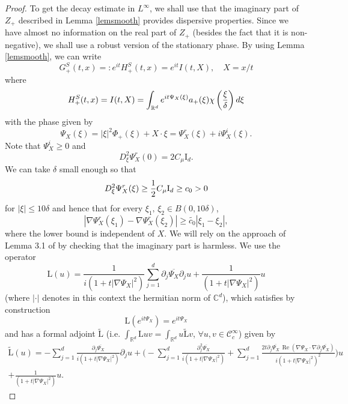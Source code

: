 \documentclass[11pt]{amsart}
\numberwithin{equation}{section}
\begin{document}
\begin{proof}
   To get the decay estimate in $L^\infty$, we shall use that the imaginary part  of $Z_{+}$ described in Lemma  \ref{lemsmooth}
     provides dispersive properties. 
    Since we have almost no information on the real part of $Z_{+}$ (besides the fact that it is non-negative), we shall use a robust version of the stationary
    phase.   By using Lemma   \ref{lemsmooth}, we can write
    $$   G^S_{+}(t,x)=: e^{it} H^S_{+}(t,x)= e^{it} I(t, X), \quad X= x/t$$
    where
    \begin{equation}
    \label{defHS+} H^S_{+}(t,x)=  I(t,X) = \int_{\mathbb{R}^d}  e^{ i t  \Psi_{X}(\xi) }  a_{+}(\xi) \chi\left({\xi \over \delta} \right)
    d \xi
    \end{equation}
    with the phase given by 
    $$ \Psi_{X}(\xi) = |\xi|^2 \Phi_{+}(\xi) +   X \cdot \xi= \Psi_{X}^r(\xi) + i \Psi_{X}^i(\xi).$$
    Note  that  $ \Psi_{X}^i  \ge 0$ and 
    $$ D_{\xi}^2\Psi^r_{X} (0)=   2  {C_{\mu}} \mbox{I}_{d}.$$
  We can take  $\delta $ small enough so that
  \begin{equation}
  \label{phasebelow0}   D_{\xi}^2\Psi^r_{X} (\xi) \geq    {1 \over 2}  {C_{\mu}} \mbox{I}_{d} \geq c_{0}>0
  \end{equation}
  for $| \xi| \leq  10 \delta$
  and hence  that for every $\xi_{1}, \, \xi_{2}  \in B(0, 10\delta)$, 
    \begin{equation}
    \label{phasebelow} | \nabla  \Psi^r_{X}(\xi_{1}) - \nabla  \Psi^r_{X}(\xi_{2}) | \geq  \tilde{ c_{0}}| \xi_{1} - \xi_{2}|,  
    \end{equation}
    where the lower bound is independent of $X$.
    We will rely on the approach of Lemma 3.1 of \cite{Farah-Rousset-Tzvetkov} by checking that the imaginary part
     is harmless.
 We use the operator
$$
\mathrm{L}(u)=\frac{1}{i(1+t|\nabla \Psi_{X}|^2)}\sum_{j=1}^{d} \partial_{j}\overline{\Psi_{X}}\partial_{j}u
+
\frac{1}{(1+t |\nabla \Psi_{X}|^2)}u 
$$
(where $| \cdot |$ denotes in this context the hermitian norm of $\mathbb{C}^d$),
which satisfies by construction 
\begin{equation}\label{id-L}
\mathrm{L}(e^{it\Psi_{X}})=e^{it\Psi_{X}}
\end{equation}
and has a formal adjoint $\widetilde{\mathrm{L}}$ (i.e. $\int_{\mathbb{R}^d}\mathrm{L}u v= \int_{\mathbb{R}^d} u \widetilde{\mathrm{L}} v $, $\forall u,v \in \mathscr{C}^\infty_{c}$)  given by
\begin{multline*}
\widetilde{\mathrm{L}}(u)=-\sum_{j=1}^{d}\frac{\partial_{j}\overline{\Psi_X}}{i(1+t |\nabla\Psi_{X}|^2)}\partial_{j}u+
\Big(
-\sum_{j=1}^{d}\frac{\partial_{j}^{2}\overline{\Psi_X}}{i(1+ t |\nabla\Psi_{X}|^2)}+ 
\sum_{j=1}^{d}\frac{2t\partial_{j}\overline{\Psi_X}\,{\operatorname{Re} }(\nabla\Psi_{X}\cdot\nabla\partial_{j} \overline{\Psi_{X}})}{i(1+t|\nabla\Psi_{X}|^2)^2}\Big)u
\\+\frac{1}{(1+t |\nabla\Psi_{X}|^2)}u.
\end{multline*}


\end{proof}
\end{document}
